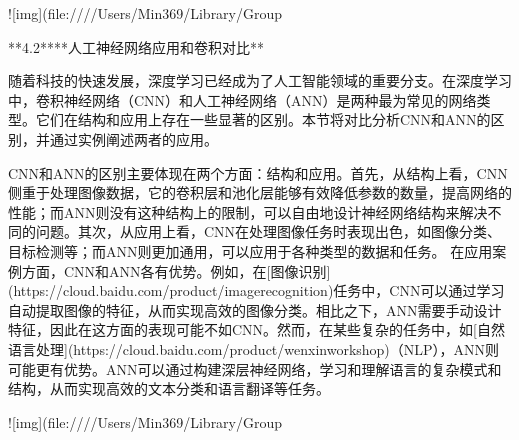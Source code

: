 ![img](file:////Users/Min369/Library/Group%

**4.2****人工神经网络应用和卷积对比**

随着科技的快速发展，深度学习已经成为了人工智能领域的重要分支。在深度学习中，卷积神经网络（CNN）和人工神经网络（ANN）是两种最为常见的网络类型。它们在结构和应用上存在一些显著的区别。本节将对比分析CNN和ANN的区别，并通过实例阐述两者的应用。



CNN和ANN的区别主要体现在两个方面：结构和应用。首先，从结构上看，CNN侧重于处理图像数据，它的卷积层和池化层能够有效降低参数的数量，提高网络的性能；而ANN则没有这种结构上的限制，可以自由地设计神经网络结构来解决不同的问题。其次，从应用上看，CNN在处理图像任务时表现出色，如图像分类、目标检测等；而ANN则更加通用，可以应用于各种类型的数据和任务。
在应用案例方面，CNN和ANN各有优势。例如，在[图像识别](https://cloud.baidu.com/product/imagerecognition)任务中，CNN可以通过学习自动提取图像的特征，从而实现高效的图像分类。相比之下，ANN需要手动设计特征，因此在这方面的表现可能不如CNN。然而，在某些复杂的任务中，如[自然语言处理](https://cloud.baidu.com/product/wenxinworkshop)（NLP），ANN则可能更有优势。ANN可以通过构建深层神经网络，学习和理解语言的复杂模式和结构，从而实现高效的文本分类和语言翻译等任务。

![img](file:////Users/Min369/Library/Group%





